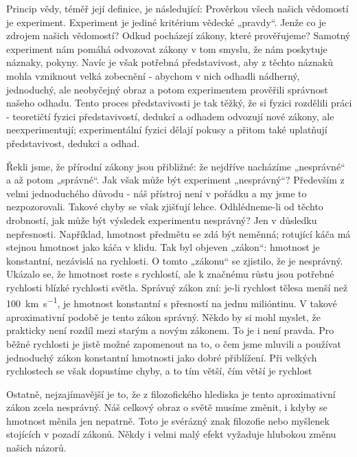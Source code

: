 {    Princip vědy, téměř její definice, je následující: Prověrkou všech našich vědomostí je 
    experiment. Experiment je jediné kritérium vědecké „pravdy“. Jenže co je zdrojem našich 
    vědomostí? Odkud pocházejí zákony, které prověřujeme? Samotný experiment nám pomáhá odvozovat 
    zákony v tom smyslu, že nám poskytuje náznaky, pokyny. Navíc je však potřebná představivost, 
    aby z těchto náznaků mohla vzniknout velká zobecnění - abychom v nich odhadli nádherný, 
    jednoduchý, ale neobyčejný obraz a potom experimentem prověřili správnost našeho odhadu. Tento 
    proces představivosti je tak těžký, že si fyzici rozdělili práci - teoretičtí fyzici 
    představivostí, dedukcí a odhadem odvozují nové zákony, ale neexperimentují; experimentální 
    fyzici dělají pokusy a přitom také uplatňují představivost, dedukci a odhad.
    
    Řekli jsme, že přírodní zákony jsou přibližné: že nejdříve nacházíme „nesprávné“ a až potom 
    „správné“. Jak však může být experiment „nesprávný“? Především z velmi jednoduchého důvodu - 
    náš přístroj není v pořádku a my jsme to nezpozorovali. Takové chyby se však zjišťují lehce. 
    Odhlédneme-li od těchto drobností, jak může být výsledek experimentu nesprávný? Jen v důsledku 
    nepřesnosti. Například, hmotnost předmětu se zdá být neměnná; rotující káča má stejnou hmotnost 
    jako káča v klidu. Tak byl objeven „zákon“: hmotnost je konstantní, nezávislá na rychlosti. O 
    tomto „zákonu“ se zjistilo, že je nesprávný. Ukázalo se, že hmotnost roste s rychlostí, ale k 
    značnému růstu jsou potřebné rychlosti blízké rychlosti světla. Správný zákon zní: je-li 
    rychlost tělesa menší než \SI{100}{\km\per\second}, je hmotnost konstantní s přesností na jednu 
    milióntinu. V takové aproximativní podobě je tento zákon správný. Někdo by si mohl myslet, že 
    prakticky není rozdíl mezi starým a novým zákonem. To je i není pravda. Pro běžné rychlosti je 
    jistě možné zapomenout na to, o čem jsme mluvili a používat jednoduchý zákon konstantní 
    hmotnosti jako dobré přiblížení. Při velkých rychlostech se však dopustíme chyby, a to tím 
    větší, čím větší je rychlost
    
    Ostatně, nejzajímavější je to, že z filozofického hlediska je tento aproximativní zákon zcela 
    nesprávný. Náš celkový obraz o světě musíme změnit, i kdyby se hmotnost měnila jen nepatrně. 
    Toto je svérázný znak filozofie nebo myšlenek stojících v pozadí zákonů. Někdy i velmi malý 
    efekt vyžaduje hlubokou změnu našich názorů.
    
}
